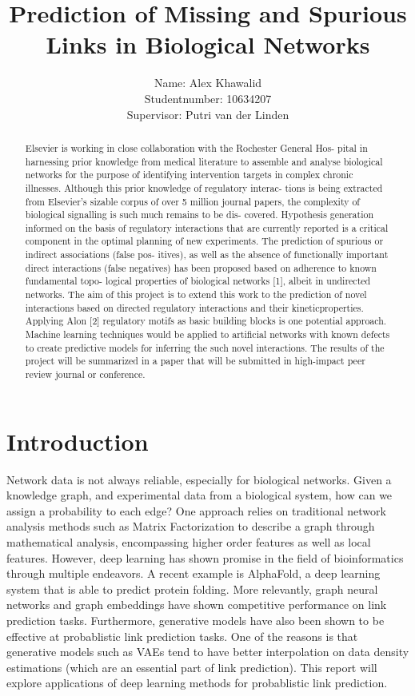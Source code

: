\documentclass{article}
\title{Prediction of Missing and Spurious Links in Biological Networks}
\author{
    Name: Alex Khawalid\\
    Studentnumber: 10634207\\
    Supervisor: Putri van der Linden\\
}
\begin{document}
    \maketitle

    \begin{abstract}
        Elsevier is working in close collaboration with the Rochester General Hos- pital in harnessing prior knowledge from medical literature to assemble and analyse biological networks for the purpose of identifying intervention targets in complex chronic illnesses. Although this prior knowledge of regulatory interac- tions is being extracted from Elsevier’s sizable corpus of over 5 million journal papers, the complexity of biological signalling is such much remains to be dis- covered. Hypothesis generation informed on the basis of regulatory interactions that are currently reported is a critical component in the optimal planning of new experiments. The prediction of spurious or indirect associations (false pos- itives), as well as the absence of functionally important direct interactions (false negatives) has been proposed based on adherence to known fundamental topo- logical properties of biological networks [1], albeit in undirected networks. The aim of this project is to extend this work to the prediction of novel interactions based on directed regulatory interactions and their kineticproperties. Applying Alon [2] regulatory motifs as basic building blocks is one potential approach. Machine learning techniques would be applied to artificial networks with known defects to create predictive models for inferring the such novel interactions. The results of the project will be summarized in a paper that will be submitted in high-impact peer review journal or conference.
    \end{abstract}

    \section{Introduction}
    Network data is not always reliable, especially for biological networks. Given a knowledge graph, and experimental data from a biological system, how can we assign a probability to each edge? One approach relies on traditional network analysis methods such as Matrix Factorization to describe a graph through mathematical analysis, encompassing higher order features as well as local features. However, deep learning has shown promise in the field of bioinformatics through multiple endeavors. A recent example is AlphaFold, a deep learning system that is able to predict protein folding. More relevantly, graph neural networks and graph embeddings have shown competitive performance on link prediction tasks. Furthermore, generative models have also been shown to be effective at probablistic link prediction tasks. One of the reasons is that generative models such as VAEs tend to have better interpolation on data density estimations (which are an essential part of link prediction). This report will explore applications of deep learning methods for probablistic link prediction.
\end{document}
